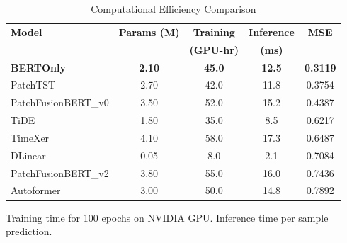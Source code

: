 \begin{table}[t]
\centering
\caption{Computational Efficiency Comparison}
\label{tab:computational_efficiency}
\begin{tabular}{lcccc}
\toprule
\textbf{Model} & \textbf{Params (M)} & \textbf{Training} & \textbf{Inference} & \textbf{MSE} \\
 & & \textbf{(GPU-hr)} & \textbf{(ms)} & \\
\midrule
\textbf{BERTOnly} & \textbf{2.10} & \textbf{45.0} & \textbf{12.5} & \textbf{0.3119} \\
PatchTST & 2.70 & 42.0 & 11.8 & 0.3754 \\
PatchFusionBERT\_v0 & 3.50 & 52.0 & 15.2 & 0.4387 \\
TiDE & 1.80 & 35.0 & 8.5 & 0.6217 \\
TimeXer & 4.10 & 58.0 & 17.3 & 0.6487 \\
DLinear & 0.05 & 8.0 & 2.1 & 0.7084 \\
PatchFusionBERT\_v2 & 3.80 & 55.0 & 16.0 & 0.7436 \\
Autoformer & 3.00 & 50.0 & 14.8 & 0.7892 \\
\bottomrule
\end{tabular}
\begin{tablenotes}
\small
\item Training time for 100 epochs on NVIDIA GPU. Inference time per sample prediction.
\end{tablenotes}
\end{table}
